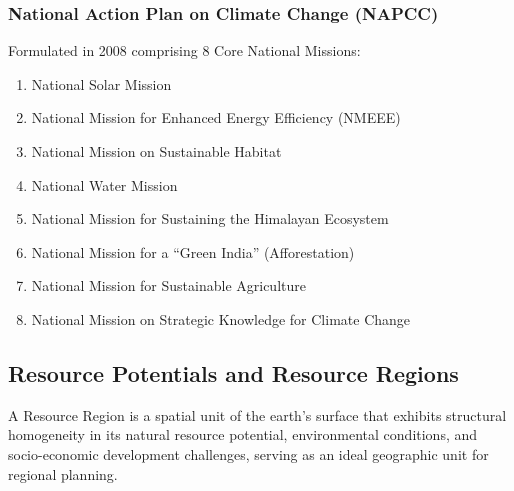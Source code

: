 \documentclass[11pt,a4paper]{article}
\begin{document}
\subsubsection{National Action Plan on Climate Change (NAPCC)}
Formulated in 2008 comprising 8 Core National Missions:
\begin{enumerate}[leftmargin=*]
  \item National Solar Mission
  \item National Mission for Enhanced Energy Efficiency (NMEEE)
  \item National Mission on Sustainable Habitat
  \item National Water Mission
  \item National Mission for Sustaining the Himalayan Ecosystem
  \item National Mission for a ``Green India'' (Afforestation)
  \item National Mission for Sustainable Agriculture
  \item National Mission on Strategic Knowledge for Climate Change
\end{enumerate}

\subsection{Resource Potentials and Resource Regions}

\begin{defbox}
A Resource Region is a spatial unit of the earth's surface that exhibits structural homogeneity in its natural resource potential, environmental conditions, and socio-economic development challenges, serving as an ideal geographic unit for regional planning.
\end{defbox}
\end{document}
